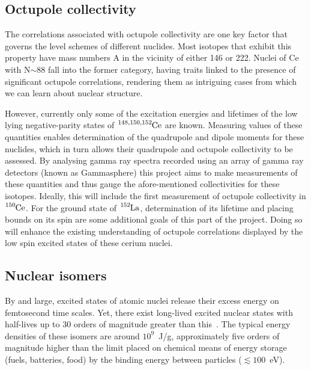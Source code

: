 \documentclass[12pt,a4paper]{article}
\begin{document}
\subsection*{Octupole collectivity}

\medskip
The correlations associated with octupole collectivity are one key factor that governs the level schemes of different nuclides. Most isotopes that exhibit this property have mass numbers A in the vicinity of either 146 or 222. Nuclei of Ce with N$\sim$88 fall into the former category, having traits linked to the presence of significant octupole correlations, rendering them as intriguing cases from which we can learn about nuclear structure.

\medskip
However, currently only some of the excitation energies and lifetimes of the low lying negative-parity states of $\ce{^{148,150,152}Ce}$ are known. Measuring values of these quantities enables determination of the quadrupole and dipole moments for these nuclides, which in turn allows their quadrupole and octupole collectivity to be assessed. By analysing gamma ray spectra recorded using an array of gamma ray detectors (known as Gammasphere) this project aims to make measurements of these quantities and thus gauge the afore-mentioned collectivities for these isotopes. 
Ideally, this will include the first measurement of octupole collectivity in $\ce{^{150}Ce}$.
For the ground state of $\ce{^{152}La}$, determination of its lifetime and placing bounds on its spin are some additional goals of this part of the project.
Doing so will enhance the existing understanding of octupole correlations displayed by the low spin excited states of these cerium nuclei.

\subsection*{Nuclear isomers}

\medskip
By and large, excited states of atomic nuclei release their excess energy on femtosecond time scales. Yet, there exist long-lived excited nuclear states with half-lives up to 30 orders of magnitude greater than this~\cite{shaffer_innovations_2018}. The typical energy densities of these isomers are around $10^9$~J/g, approximately five orders of magnitude higher than the limit placed on chemical means of energy storage (fuels, batteries, food) by the binding energy between particles ($\lesssim 100$~eV).
\end{document}
